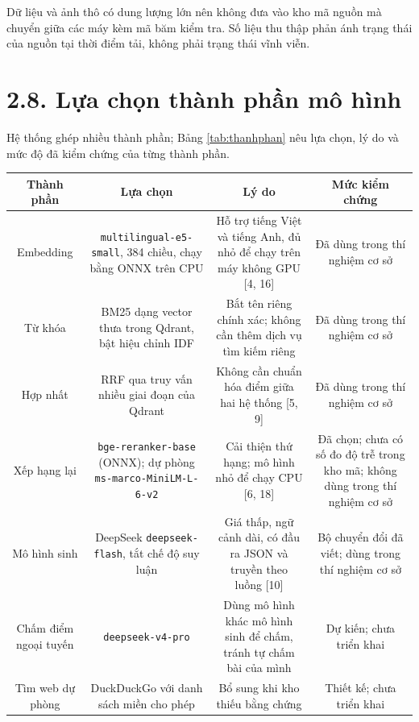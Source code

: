 Dữ liệu và ảnh thô có dung lượng lớn nên không đưa vào kho mã nguồn mà chuyển giữa các máy kèm mã băm kiểm tra. Số liệu thu thập phản ánh trạng thái của nguồn tại thời điểm tải, không phải trạng thái vĩnh viễn.


\section{2.8. Lựa chọn thành phần mô hình}

Hệ thống ghép nhiều thành phần; Bảng \ref{tab:thanhphan} nêu lựa chọn, lý do và mức độ đã kiểm chứng của từng thành phần.


\begin{longtable*}{|C{0.15}|C{0.25}|C{0.37}|C{0.23}|}
\hline \textbf{Thành phần} & \textbf{Lựa chọn} & \textbf{Lý do} & \textbf{Mức kiểm chứng} \\ \hline
Embedding & \texttt{multilingual-\allowbreak e5-small}, 384 chiều, chạy bằng ONNX trên CPU & Hỗ trợ tiếng Việt và tiếng Anh, đủ nhỏ để chạy trên máy không GPU [4, 16] & Đã dùng trong thí nghiệm cơ sở \\ \hline
Từ khóa & BM25 dạng vector thưa trong Qdrant, bật hiệu chỉnh IDF & Bắt tên riêng chính xác; không cần thêm dịch vụ tìm kiếm riêng & Đã dùng trong thí nghiệm cơ sở \\ \hline
Hợp nhất & RRF qua truy vấn nhiều giai đoạn của Qdrant & Không cần chuẩn hóa điểm giữa hai hệ thống [5, 9] & Đã dùng trong thí nghiệm cơ sở \\ \hline
Xếp hạng lại & \texttt{bge-reranker-base} (ONNX); dự phòng \texttt{ms-marco-\allowbreak MiniLM-\allowbreak L-6-v2} & Cải thiện thứ hạng; mô hình nhỏ để chạy CPU [6, 18] & Đã chọn; chưa có số đo độ trễ trong kho mã; không dùng trong thí nghiệm cơ sở \\ \hline
Mô hình sinh & DeepSeek \texttt{deepseek-flash}, tắt chế độ suy luận & Giá thấp, ngữ cảnh dài, có đầu ra JSON và truyền theo luồng [10] & Bộ chuyển đổi đã viết; dùng trong thí nghiệm cơ sở \\ \hline
Chấm điểm ngoại tuyến & \texttt{deepseek-v4-pro} & Dùng mô hình khác mô hình sinh để chấm, tránh tự chấm bài của mình & Dự kiến; chưa triển khai \\ \hline
Tìm web dự phòng & DuckDuckGo với danh sách miền cho phép & Bổ sung khi kho thiếu bằng chứng & Thiết kế; chưa triển khai \\ \hline
\end{longtable*}
\tabend


